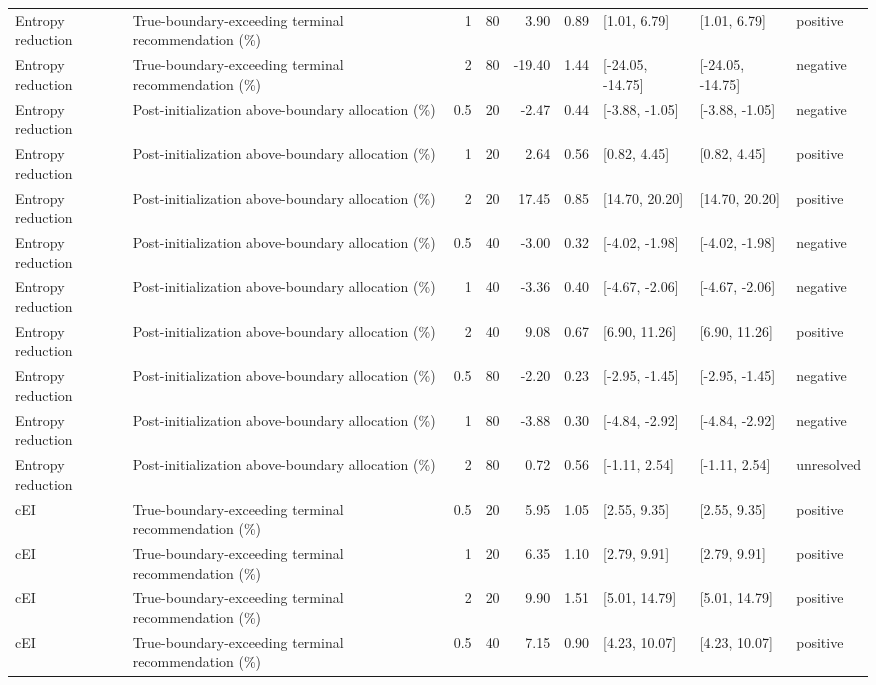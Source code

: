 \begin{longtable}{p{1.8cm}p{3.0cm}rrrrp{2.6cm}p{2.6cm}p{1.6cm}}
Entropy reduction & True-boundary-exceeding terminal recommendation (\%) & 1 & 80 & 3.90 & 0.89 & [1.01, 6.79] & [1.01, 6.79] & positive \\
Entropy reduction & True-boundary-exceeding terminal recommendation (\%) & 2 & 80 & -19.40 & 1.44 & [-24.05, -14.75] & [-24.05, -14.75] & negative \\
Entropy reduction & Post-initialization above-boundary allocation (\%) & 0.5 & 20 & -2.47 & 0.44 & [-3.88, -1.05] & [-3.88, -1.05] & negative \\
Entropy reduction & Post-initialization above-boundary allocation (\%) & 1 & 20 & 2.64 & 0.56 & [0.82, 4.45] & [0.82, 4.45] & positive \\
Entropy reduction & Post-initialization above-boundary allocation (\%) & 2 & 20 & 17.45 & 0.85 & [14.70, 20.20] & [14.70, 20.20] & positive \\
Entropy reduction & Post-initialization above-boundary allocation (\%) & 0.5 & 40 & -3.00 & 0.32 & [-4.02, -1.98] & [-4.02, -1.98] & negative \\
Entropy reduction & Post-initialization above-boundary allocation (\%) & 1 & 40 & -3.36 & 0.40 & [-4.67, -2.06] & [-4.67, -2.06] & negative \\
Entropy reduction & Post-initialization above-boundary allocation (\%) & 2 & 40 & 9.08 & 0.67 & [6.90, 11.26] & [6.90, 11.26] & positive \\
Entropy reduction & Post-initialization above-boundary allocation (\%) & 0.5 & 80 & -2.20 & 0.23 & [-2.95, -1.45] & [-2.95, -1.45] & negative \\
Entropy reduction & Post-initialization above-boundary allocation (\%) & 1 & 80 & -3.88 & 0.30 & [-4.84, -2.92] & [-4.84, -2.92] & negative \\
Entropy reduction & Post-initialization above-boundary allocation (\%) & 2 & 80 & 0.72 & 0.56 & [-1.11, 2.54] & [-1.11, 2.54] & unresolved \\
cEI & True-boundary-exceeding terminal recommendation (\%) & 0.5 & 20 & 5.95 & 1.05 & [2.55, 9.35] & [2.55, 9.35] & positive \\
cEI & True-boundary-exceeding terminal recommendation (\%) & 1 & 20 & 6.35 & 1.10 & [2.79, 9.91] & [2.79, 9.91] & positive \\
cEI & True-boundary-exceeding terminal recommendation (\%) & 2 & 20 & 9.90 & 1.51 & [5.01, 14.79] & [5.01, 14.79] & positive \\
cEI & True-boundary-exceeding terminal recommendation (\%) & 0.5 & 40 & 7.15 & 0.90 & [4.23, 10.07] & [4.23, 10.07] & positive \\

\end{longtable}
